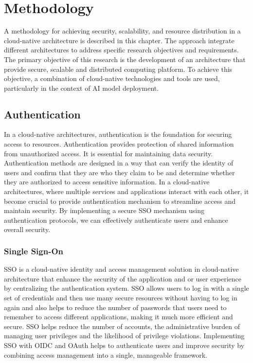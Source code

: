 \chapter{Methodology}

A methodology for achieving security, scalability, and resource distribution in a cloud-native architecture is described in this chapter. The approach integrate different architectures to address specific research objectives and requirements. The primary objective of this research is the development of an architecture that provide secure, scalable and distributed computing platform. To achieve this objective, a combination of cloud-native technologies and tools are used, particularly in the context of AI model deployment.

\section{Authentication}

In a cloud-native architectures, authentication is the foundation for securing access to resources. Authentication provides protection of shared information from unauthorized access. It is essential for maintaining data security. Authentication methods are designed in a way that can verify the identity of users and confirm that they are who they claim to be and determine whether they are authorized to access sensitive information. In a cloud-native architectures, where multiple services and applications interact with each other, it become crucial to provide authentication mechanism to streamline access and maintain security. By implementing a secure SSO mechanism using authentication protocols, we can effectively authenticate users and enhance overall security. \cite{babaeizadeh2015authentication}

\subsection{Single Sign-On}

SSO is a cloud-native identity and access management solution in cloud-native architecture that enhance the security of the application and or user experience by centralizing the authentication system. SSO allows users to log in with a single set of credentials and then use many secure resources without having to log in again and also helps to reduce the number of passwords that users need to remember to access different applications, making it much more efficient and secure. SSO helps reduce the number of accounts, the administrative burden of managing user privileges and the likelihood of privilege violations. Implementing SSO with OIDC and OAuth helps to authenticate users and improve security by combining access management into a single, manageable framework. \cite{babaeizadeh2015authentication}

